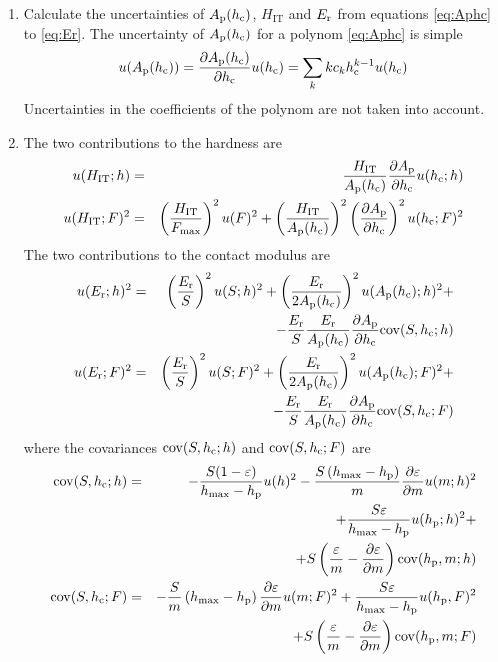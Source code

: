 \begin{enumerate}
  \item \label{opodr_unc_A}
Calculate the uncertainties of $\Ap(\hc)$, $H_{\mathrm{IT}}$ and $\Er$ from equations \eqref{eq:Aphc} to \eqref{eq:Er}.
 The uncertainty of $\Ap(\hc)$ for a polynom \eqref{eq:Aphc} is simple
 \begin{equation}
  u(\Ap(\hc)) = \ddp{ \Ap(\hc)}{\hc} u(\hc) =  \sum_{k} k c_k \hc^{k-1} u(\hc)
 \end{equation}
Uncertainties in the coefficients of the polynom are not taken into account. \\

\item \label{opodr_unc_H_E}
The two contributions to the hardness are
 \begin{eqnarray} 
u(\Hit;h)&=&    \frac{\Hit}{\Ap(\hc)} \ddp{ \Ap}{\hc} u(\hc;h) \\
u(\Hit;F)^2 &=& 
 \left( \frac{\Hit}{ \Fmax}\right)^2 u(F)^2 + 
 \left( \frac{\Hit}{\Ap(\hc)} \right)^2 \left(\ddp{ \Ap}{\hc}  \right)^2 u(\hc;F)^2 \nonumber \\
\end{eqnarray}
The two contributions to the contact modulus are
\begin{eqnarray}
 u(\Er;h)^2 &=& 
 \left( \frac{ \Er}{ S}\right)^2 u(S;h)^2 + 
 \left( \frac{ \Er}{ 2\Ap(\hc)} \right)^2 u(\Ap(\hc);h)^2 + \nonumber \\ 
  && -  \frac{ \Er}{ S}\frac{ \Er}{ \Ap(\hc)} \ddp{\Ap}{\hc} \cov(S,\hc;h) \\
 u(\Er;F)^2 &=& 
 \left( \frac{ \Er}{ S}\right)^2 u(S;F)^2 + 
 \left( \frac{ \Er}{ 2\Ap(\hc)} \right)^2 u(\Ap(\hc);F)^2 + \nonumber \\ 
  && -  \frac{ \Er}{ S}\frac{ \Er}{ \Ap(\hc)} \ddp{\Ap}{\hc} \cov(S,\hc;F)    
\end{eqnarray}
where the covariances $\cov(S,\hc;h)$ and $\cov(S,\hc;F)$ are
\begin{eqnarray}
  \cov(S,\hc;h) 
  &=& 
  -\frac{ S(1-\varepsilon) }{ \hmax-\hp}  u(h)^2 
  - \frac{S\left( \hmax - \hp\right)}{m}  \depsdm  u(m;h)^2  \nonumber \\
  &&+
  \frac{ S \varepsilon}{\hmax- \hp}  u(\hp;h)^2 + \nonumber\\
  && +S \left( \frac{ \varepsilon }{ m}  - \depsdm \right)  \cov(\hp, m;h) \\
\cov(S,\hc;F) 
  &=&
   - \frac{ S }{ m} \left(\hmax -\hp\right) \depsdm  u(m;F)^2  +  \frac{ S \varepsilon }{\hmax - \hp} u(\hp,F)^2  \nonumber \\
  && +S \left( \frac{ \varepsilon }{ m}  - \depsdm \right)  \cov(\hp, m;F)
   \end{eqnarray}


\end{enumerate}
